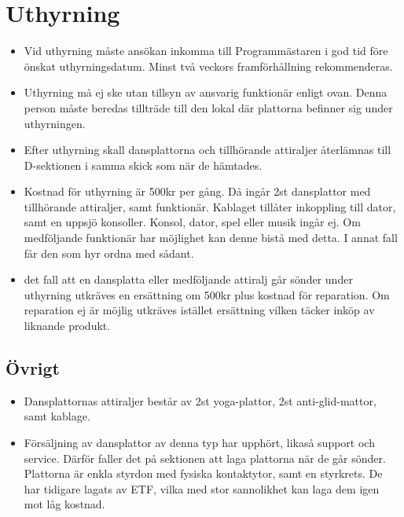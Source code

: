 \documentclass{dsekprotokoll}
\begin{document}
\section{Uthyrning}
\begin{itemize}
  \item Vid uthyrning måste ansökan inkomma till Programmästaren i
    god tid före önskat uthyrningsdatum. Minst två veckors
    framförhållning rekommenderas.
  \item Uthyrning må ej ske utan tillsyn av ansvarig funktionär
    enligt ovan. Denna person måste beredas tillträde till den lokal
    där plattorna befinner sig under uthyrningen.
  \item Efter uthyrning skall dansplattorna och tillhörande
    attiraljer återlämnas till D-sektionen i samma skick som när de hämtades.
  \item Kostnad för uthyrning är 500kr per gång. Då ingår 2st
    dansplattor med tillhörande attiraljer, samt funktionär. Kablaget
    tillåter inkoppling till dator, samt en uppsjö konsoller. Konsol,
    dator, spel eller musik ingår ej. Om medföljande funktionär har
    möjlighet kan denne bistå med detta. I annat fall får den som hyr
    ordna med sådant.
  \item det fall att en dansplatta eller medföljande attiralj går
    sönder under uthyrning utkräves en ersättning om 500kr plus
    kostnad för reparation. Om reparation ej är möjlig utkräves
    istället ersättning vilken täcker inköp av liknande produkt.
\end{itemize}

\subsection{Övrigt}
\begin{itemize}
  \item Dansplattornas attiraljer består av 2st yoga-plattor, 2st
    anti-glid-mattor, samt kablage.
  \item Försäljning av dansplattor av denna typ har upphört, likaså
    support och service. Därför faller det på sektionen att laga
    plattorna när de går sönder. Plattorna är enkla styrdon med
    fysiska kontaktytor, samt en styrkrets. De har tidigare lagats av
    ETF, vilka med stor sannolikhet kan laga dem igen mot låg kostnad.
\end{itemize}
\end{document}

